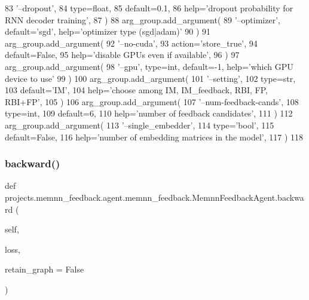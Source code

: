 \begin{DoxyCode}
83             \textcolor{stringliteral}{'--dropout'},
84             type=float,
85             default=0.1,
86             help=\textcolor{stringliteral}{'dropout probability for RNN decoder training'},
87         )
88         arg\_group.add\_argument(
89             \textcolor{stringliteral}{'--optimizer'}, default=\textcolor{stringliteral}{'sgd'}, help=\textcolor{stringliteral}{'optimizer type (sgd|adam)'}
90         )
91         arg\_group.add\_argument(
92             \textcolor{stringliteral}{'--no-cuda'},
93             action=\textcolor{stringliteral}{'store\_true'},
94             default=\textcolor{keyword}{False},
95             help=\textcolor{stringliteral}{'disable GPUs even if available'},
96         )
97         arg\_group.add\_argument(
98             \textcolor{stringliteral}{'--gpu'}, type=int, default=-1, help=\textcolor{stringliteral}{'which GPU device to use'}
99         )
100         arg\_group.add\_argument(
101             \textcolor{stringliteral}{'--setting'},
102             type=str,
103             default=\textcolor{stringliteral}{'IM'},
104             help=\textcolor{stringliteral}{'choose among IM, IM\_feedback, RBI, FP, RBI+FP'},
105         )
106         arg\_group.add\_argument(
107             \textcolor{stringliteral}{'--num-feedback-cands'},
108             type=int,
109             default=6,
110             help=\textcolor{stringliteral}{'number of feedback candidates'},
111         )
112         arg\_group.add\_argument(
113             \textcolor{stringliteral}{'--single\_embedder'},
114             type=\textcolor{stringliteral}{'bool'},
115             default=\textcolor{keyword}{False},
116             help=\textcolor{stringliteral}{'number of embedding matrices in the model'},
117         )
118 
\end{DoxyCode}
\mbox{\label{classprojects_1_1memnn__feedback_1_1agent_1_1memnn__feedback_1_1MemnnFeedbackAgent_a79db903bd9937e09ba96eee4ba9ceb6d}} 
\subsubsection{\texorpdfstring{backward()}{backward()}}
{\footnotesize\ttfamily def projects.\+memnn\+\_\+feedback.\+agent.\+memnn\+\_\+feedback.\+Memnn\+Feedback\+Agent.\+backward (\begin{DoxyParamCaption}\item[{}]{self,  }\item[{}]{loss,  }\item[{}]{retain\+\_\+graph = {\ttfamily False} }\end{DoxyParamCaption})}



